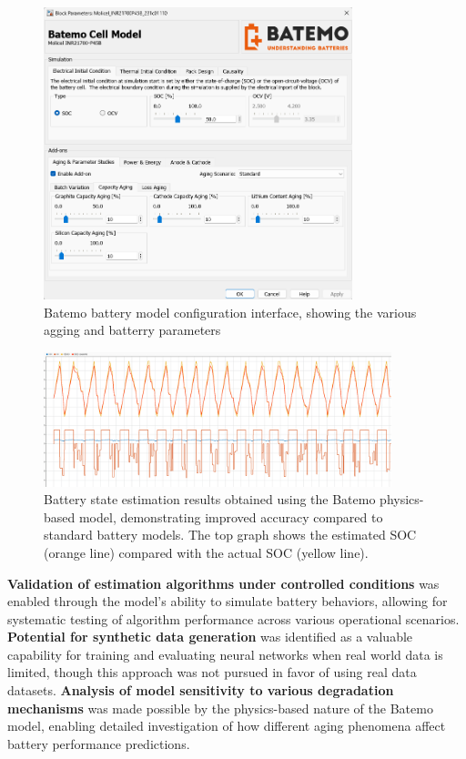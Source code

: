 \begin{figure}[htbp]
\centering
\includegraphics[width=0.8\textwidth]{imgs/batemo_configurations.png}
\caption{Batemo battery model configuration interface, showing the various agging and batterry parameters}
\label{fig:batemo_configurations}
\end{figure}

\begin{figure}[htbp]
\centering
\includegraphics[width=0.9\textwidth]{imgs/batemo_estimation.png}
\caption{Battery state estimation results obtained using the Batemo physics-based model, demonstrating improved accuracy compared to standard battery models. The top graph shows the estimated SOC (orange line) compared with the actual SOC (yellow line).}
\label{fig:batemo_estimation}
\end{figure}

\textbf{Validation of estimation algorithms under controlled conditions} was enabled through the model's ability to simulate battery behaviors, allowing for systematic testing of algorithm performance across various operational scenarios. \textbf{Potential for synthetic data generation} was identified as a valuable capability for training and evaluating neural networks when real world data is limited, though this approach was not pursued in favor of using real data datasets. \textbf{Analysis of model sensitivity to various degradation mechanisms} was made possible by the physics-based nature of the Batemo model, enabling detailed investigation of how different aging phenomena affect battery performance predictions. 

